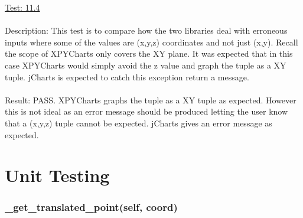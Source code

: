 \documentclass[12pt, titlepage]{article}
\begin{document}
\underline{Test: 11.4}\\\\\label{sec:11.4}
Description: This test is to compare how the two libraries deal with erroneous inputs where some of the values are (x,y,z) coordinates and not just (x,y). Recall the scope of XPYCharts only covers the XY plane. It was expected that in this case XPYCharts would simply avoid the z value and graph the tuple as a XY tuple. jCharts is expected to catch this exception return a message.\\\\

Result: PASS. XPYCharts graphs the tuple as a XY tuple as expected. However this is not ideal as an error message should be produced letting the user know that a (x,y,z) tuple cannot be expected. jCharts gives an error message as expected.\\

\section{Unit Testing}\label{sec:unittest}


\subsubsection{\_get\_translated\_point(self, coord)}		
	\label{sec:4.0.1}
\end{document}
